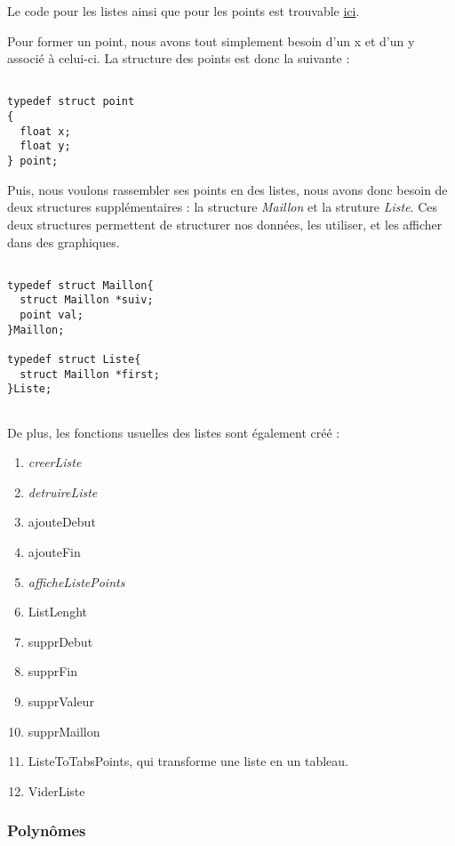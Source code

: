\documentclass[letter]{article}
\begin{document}
Le code pour les listes ainsi que pour les points est trouvable \href{listePoint.c}{ici}.

Pour former un point, nous avons tout simplement besoin d'un x et d'un y associé à celui-ci.
La structure des points est donc la suivante :

\begin{verbatim}

typedef struct point
{
  float x;
  float y;
} point;

\end{verbatim}

Puis, nous voulons rassembler ses points en des listes, nous avons donc besoin de deux structures supplémentaires : la structure \emph{Maillon} et la struture \emph{Liste}. Ces deux structures permettent de structurer nos données, les utiliser, et les afficher dans des graphiques.

\begin{verbatim}

typedef struct Maillon{
  struct Maillon *suiv;
  point val;
}Maillon;

typedef struct Liste{
  struct Maillon *first;
}Liste;


\end{verbatim}

De plus, les fonctions usuelles des listes sont également créé :
\begin{enumerate}
\item \emph{creerListe}
\item \emph{detruireListe}
\item ajouteDebut
\item ajouteFin
\item \emph{afficheListePoints}
\item ListLenght
\item supprDebut
\item supprFin
\item supprValeur
\item supprMaillon
\item ListeToTabsPoints, qui transforme une liste en un tableau.
\item ViderListe
\end{enumerate}



\subsubsection{Polynômes}
\label{sec:org4ed6f4b}
\end{document}
